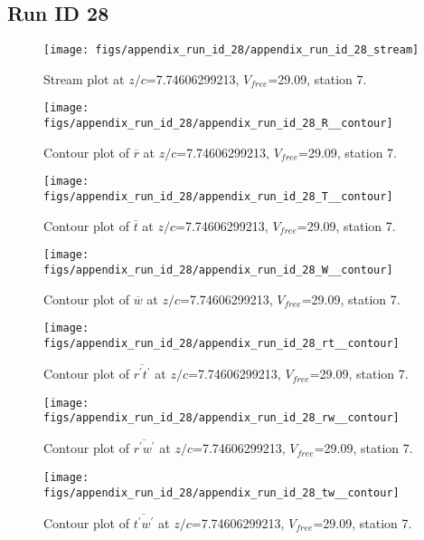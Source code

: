 \subsection{Run ID 28}
\begin{figure}[H]
\centering
\texttt{[image: figs/appendix\_run\_id\_28/appendix\_run\_id\_28\_stream]}
\caption{Stream plot at $z/c$=7.74606299213, $V_{free}$=29.09, station 7.}
\label{fig:appendix_run_id_28_stream}
\end{figure}


\begin{figure}[H]
\centering
\texttt{[image: figs/appendix\_run\_id\_28/appendix\_run\_id\_28\_R\_\_contour]}
\caption{Contour plot of $\overline{r}$ at $z/c$=7.74606299213, $V_{free}$=29.09, station 7.}
\label{fig:appendix_run_id_28_R__contour}
\end{figure}


\begin{figure}[H]
\centering
\texttt{[image: figs/appendix\_run\_id\_28/appendix\_run\_id\_28\_T\_\_contour]}
\caption{Contour plot of $\overline{t}$ at $z/c$=7.74606299213, $V_{free}$=29.09, station 7.}
\label{fig:appendix_run_id_28_T__contour}
\end{figure}


\begin{figure}[H]
\centering
\texttt{[image: figs/appendix\_run\_id\_28/appendix\_run\_id\_28\_W\_\_contour]}
\caption{Contour plot of $\overline{w}$ at $z/c$=7.74606299213, $V_{free}$=29.09, station 7.}
\label{fig:appendix_run_id_28_W__contour}
\end{figure}


\begin{figure}[H]
\centering
\texttt{[image: figs/appendix\_run\_id\_28/appendix\_run\_id\_28\_rt\_\_contour]}
\caption{Contour plot of $\overline{r^\prime t^\prime}$ at $z/c$=7.74606299213, $V_{free}$=29.09, station 7.}
\label{fig:appendix_run_id_28_rt__contour}
\end{figure}


\begin{figure}[H]
\centering
\texttt{[image: figs/appendix\_run\_id\_28/appendix\_run\_id\_28\_rw\_\_contour]}
\caption{Contour plot of $\overline{r^\prime w^\prime}$ at $z/c$=7.74606299213, $V_{free}$=29.09, station 7.}
\label{fig:appendix_run_id_28_rw__contour}
\end{figure}


\begin{figure}[H]
\centering
\texttt{[image: figs/appendix\_run\_id\_28/appendix\_run\_id\_28\_tw\_\_contour]}
\caption{Contour plot of $\overline{t^\prime w^\prime}$ at $z/c$=7.74606299213, $V_{free}$=29.09, station 7.}
\label{fig:appendix_run_id_28_tw__contour}
\end{figure}


